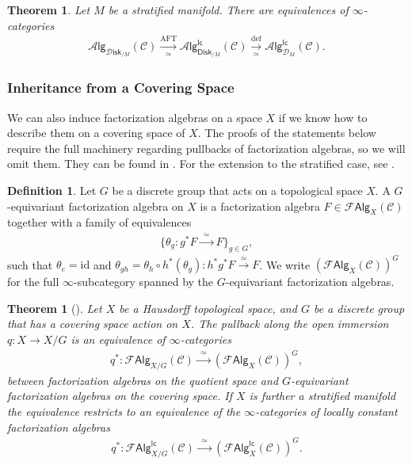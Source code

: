 \documentclass[12pt,a4paper]{article}
\newcounter{counter} \numberwithin{counter}{section}
\theoremstyle{definition}
\newtheorem{definition}[counter]{Definition}
\theoremstyle{plain}
\newtheorem{theorem}[counter]{Theorem}
\theoremstyle{remark}
\newcommand{\catC}{\mathscr{C}}
\newcommand{\falg}{\mathscr{F} \mathsf{Alg}}
\newcommand{\lcfa}{\mathscr{F} \mathsf{Alg}^{\mathsf{lc}}}
\newcommand{\disk}{\mathscr{D} \mathsf{isk}}
\newcommand{\alg}[1]{\mathscr{A} \mathsf{lg}_{#1}}
\newcommand{\lcalg}[1]{\mathscr{A} \mathsf{lg}^{\mathsf{lc}}_{#1}}
\begin{document}
\begin{theorem}\label{thm:lcfa_equivalences}
    Let $M$ be a stratified manifold. There are equivalences of $\infty$-categories
    \begin{align}
        \alg{\disk_{/M}} (\catC) \xrightarrow[\simeq]{\mathrm{AFT}} \lcalg{\mathsf{Disk}_{/M}} (\catC) \xrightarrow[\simeq]{\mathrm{def}} \lcalg{\mathscr{D}_M} (\catC).
    \end{align}
\end{theorem}


\subsubsection{Inheritance from a Covering Space}

We can also induce factorization algebras on a space $X$ if we know how to describe them on a covering space of $X$. The proofs of the statements below require the full machinery regarding pullbacks of factorization algebras, so we will omit them. They can be found in \cite[ch.7.2]{cg2016}. For the extension to the stratified case, see \cite{ginot2015}.

\begin{definition}
    Let $G$ be a discrete group that acts on a topological space $X$. A $G$-equivariant factorization algebra on $X$ is a factorization algebra $F \in \falg_X (\catC)$ together with a family of equivalences
    \begin{align}
        \{ \theta_g : g^*F \xrightarrow{\ \ \simeq \ \ } F \}_{g \in G},
    \end{align}
    such that $\theta_e = \mathrm{id}$ and $\theta_{g h} = \theta_h \circ h^*(\theta_g): h^* g^* F \xrightarrow{\simeq} F$. We write $(\falg_X (\catC))^G$ for the full $\infty$-subcategory spanned by the $G$-equivariant factorization algebras.
\end{definition}

\begin{theorem}[\cite{cg2016}]\label{thm:quotient_fas}
    Let $X$ be a Hausdorff topological space, and $G$ be a discrete group that has a covering space action on $X$. The pullback along the open immersion $q: X \rightarrow X / G$ is an equivalence of $\infty$-categories
    \begin{align}
        q^* : \falg_{X / G} (\catC) \xrightarrow{\ \ \simeq \ \ } (\falg_{X} (\catC))^G,
    \end{align}
    between factorization algebras on the quotient space and $G$-equivariant factorization algebras on the covering space. If $X$ is further a stratified manifold the equivalence restricts to an equivalence of the $\infty$-categories of locally constant factorization algebras
    \begin{align}
        q^* : \lcfa_{X / G} (\catC) \xrightarrow{\ \ \simeq \ \ } (\lcfa_{X}(\catC))^G.
    \end{align} 
\end{theorem}
\end{document}
